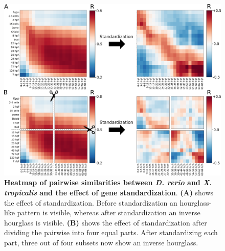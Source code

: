 \begin{figure}[H]
    \includegraphics[width=\linewidth]{ch.hourglass/images/normalisation.png}
    \caption{\textbf{Heatmap of pairwise similarities between \textit{D. rerio} and \textit{X. tropicalis} and the effect of gene standardization}. \textbf{(A)} shows the effect of standardization. Before standardization an hourglass-like pattern is visible, whereas after standardization an inverse hourglass is visible. \textbf{(B)} shows the effect of standardization after dividing the pairwise into four equal parts. After standardizing each part, three out of four subsets now show an inverse hourglass. }
    \label{fig:standardization}
\end{figure}

